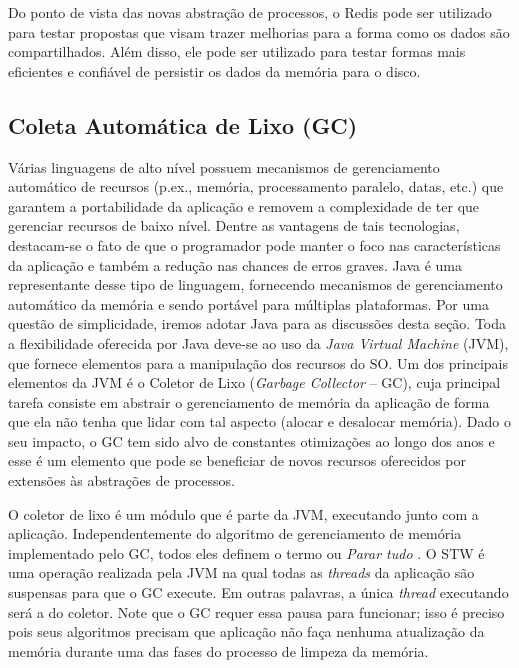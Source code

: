 
Do ponto de vista das novas abstração de processos, o Redis pode ser utilizado
para testar propostas que visam trazer melhorias para a forma como os dados são
compartilhados. Além disso, ele pode ser utilizado para testar formas mais
eficientes e confiável de persistir os dados da memória para o disco.

\subsection{Coleta Automática de Lixo (GC)}
\label{sec:gc}

Várias linguagens de alto nível possuem mecanismos de gerenciamento automático de recursos
(p.ex., memória, processamento paralelo, datas, etc.) que garantem a portabilidade
da aplicação e removem a complexidade de ter que gerenciar recursos de baixo
nível. Dentre as vantagens de tais tecnologias, destacam-se o fato de que o
programador pode manter o foco nas características da aplicação e também a redução
nas chances de erros graves. Java é uma representante desse tipo de
linguagem, fornecendo mecanismos de gerenciamento automático da memória e sendo
portável para múltiplas plataformas. Por uma questão de simplicidade, iremos
adotar Java para as discussões desta seção. Toda a flexibilidade
oferecida por Java deve-se ao uso da \emph{Java Virtual Machine} (JVM), que
fornece elementos para a manipulação dos recursos do SO. Um dos principais
elementos da JVM é o Coletor de Lixo (\emph{Garbage Collector} -- GC), cuja principal tarefa
consiste em abstrair o gerenciamento de memória da aplicação de forma que ela
não tenha que lidar com tal aspecto (alocar e desalocar memória). Dado o seu impacto, o
GC tem sido alvo de constantes otimizações ao longo dos anos e esse é um
elemento que pode se beneficiar de novos recursos oferecidos por extensões às
abstrações de processos.

O coletor de lixo é um módulo que é parte da JVM, executando junto com a aplicação.
Independentemente do algoritmo de gerenciamento de memória implementado pelo
GC, todos eles definem o termo  ou
\emph{Parar tudo} \citep{gc_pauseless}. O STW é uma operação realizada pela
JVM  na qual todas as \emph{threads} da aplicação são suspensas para que o GC execute.
Em outras palavras, a única \emph{thread} executando será a do coletor. Note que o GC
requer essa pausa para funcionar; isso é preciso pois seus algoritmos precisam que
aplicação não faça nenhuma atualização da memória durante uma das fases do
processo de limpeza da memória.

